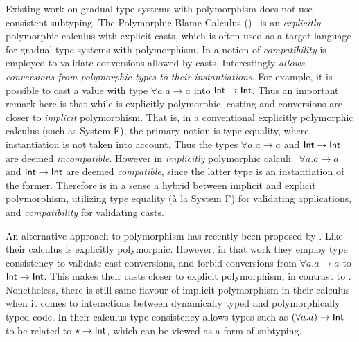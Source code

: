 Existing work on gradual type systems with polymorphism does not use
consistent subtyping. The Polymorphic Blame Calculus (\pbc)~\cite{ahmed2011blame} is
an \emph{explicitly} polymorphic calculus with explicit casts, which is
often used as a target language for gradual type systems with
polymorphism. In \pbc a notion of \emph{compatibility} is employed
to validate conversions allowed by casts. Interestingly \emph{\pbc
  allows conversions from polymorphic types to their instantiations}.
For example, it is possible to cast a value with type
$\forall a. a \to a$ into $\mathsf{Int} \to \mathsf{Int}$. Thus an
important remark here is that while \pbc is explicitly polymorphic,
casting and conversions are closer to \emph{implicit}
polymorphism. That is, in a conventional explicitly polymorphic calculus
(such as System F), the primary notion is type equality, where
instantiation is not taken into account. Thus the types
$\forall a. a \to a$ and $\mathsf{Int} \to \mathsf{Int}$ are deemed
\emph{incompatible}. However in \emph{implicitly} polymorphic
calculi~\cite{jones2007practical,dunfield2013complete}
$\forall a. a \to a$ and $\mathsf{Int} \to \mathsf{Int}$ are deemed
\emph{compatible}, since the latter type is an instantiation of the
former.  Therefore \pbc is in a sense a hybrid between implicit and
explicit polymorphism, utilizing type equality (\`a la System F) for
validating applications, and \emph{compatibility} for validating
casts. 

An alternative approach to polymorphism has recently been proposed by
\citet{yuu2017poly}. Like \pbc their calculus is explicitly
polymorphic. However, in that work they employ type consistency to validate
cast conversions, and forbid conversions from
$\forall a. a \to a$ to $\mathsf{Int} \to \mathsf{Int}$. This makes their
casts closer to explicit polymorphism, in contrast to \pbc.
Nonetheless, there is still same flavour of implicit polymorphism in
their calculus when it comes to interactions between dynamically typed
and polymorphically typed code. In their calculus type consistency
allows types such as $(\forall a. a) \to \mathsf{Int}$ to be related to $\star \to
\mathsf{Int}$, which can be viewed as a form of subtyping.


\begin{comment}
Instead several works use alternative notions such as
\emph{compatibility} of types~\cite{} or adapted versions of type
consistency~\cite{}. 
For instance both \citet{ahmed2011blame} (in the
Polymorphic Blame calculus) and \citet{yuu2017poly} define
notions of \emph{compatibility}. \jeremy{inaccurate} These two notions of compatibility
are different from each other, and they are not derived from
consistency and subtyping.
\ningning{Mention however they are trying to mixing subtyping and consistency to some degree?}
\ningning{one advantage of their systems is that they do no guessing}
Thus one first criticism to compatibility is 
that it lacks the orthogonality of notions (subtyping and consistency)
afforded by consistent subtyping~\cite{siek2007gradual}  \bruno{Ningning, has this criticism
  been pointed out by someone else before? If so, who? Citing them
  would strenghten our point}.
\ningning{I think no except Siek}
Moreover, the 
proposals for compatibility are different, which makes it unclear 
of which one is more appropriate.
\end{comment}

